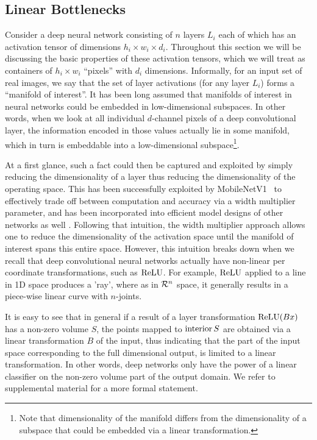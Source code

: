 \documentclass[10pt,twocolumn,letterpaper]{article}
\def\real{{\cal R}}
\DeclareMathOperator{\reluop}{ReLU}
\def\relu{\ensuremath \reluop}
\begin{document}
\subsection{Linear Bottlenecks}
\label{sec:bottlenecks}
Consider a deep neural network consisting of $n$ layers $L_i$ each of which has an activation tensor of dimensions $h_i \times w_i \times d_i$.
Throughout this section we will be discussing the basic properties of these
activation tensors, which we will treat as containers of $h_i \times
w_i$ ``pixels'' with $d_i$ dimensions.
Informally, for an input set of real images, we say that the set of layer activations (for any layer $L_i$) forms a ``manifold of interest''. It has been long assumed that manifolds of interest in neural networks could be embedded in low-dimensional subspaces.
In other words, when we look at all individual $d$-channel pixels of a deep 
convolutional layer, the information encoded in those values actually lie in some manifold, which in turn is embeddable into a low-dimensional subspace\footnote{Note that dimensionality of the manifold differs from the dimensionality of a subspace that could be embedded via a linear transformation.}.

At a first glance, such a fact could then be captured and exploited by simply reducing the dimensionality of a layer thus reducing the dimensionality of the operating space.
This has been successfully exploited by \mbox{MobileNetV1}~\cite{MobilenetV1} to effectively trade off between computation and accuracy via a width multiplier parameter, and has been incorporated into efficient model designs of other networks as well \cite{ShuffleNet2017}.
Following that intuition, the width multiplier approach allows one to reduce the dimensionality of the activation space until the manifold of interest spans
this entire space.
However, this intuition breaks down when we recall that deep convolutional neural networks actually have non-linear per coordinate transformations, such as $\relu$.
For example, $\relu$ applied to a line in 1D space produces a 'ray', where as in $\real^n$ space, it generally results in a piece-wise linear curve with $n$-joints.

It is easy to see that in general if a result of a layer transformation $\relu (B x)$ has a non-zero volume $S$, the points mapped to $\operatorname{interior}{S}$ are obtained via a linear transformation $B$ of the input, thus indicating that the part of the input space corresponding to the full dimensional output, is limited to a linear transformation.
In other words, deep networks only have the power of a linear classifier on the non-zero volume part of the output domain.
We refer to supplemental material for a more formal statement. 
\end{document}
